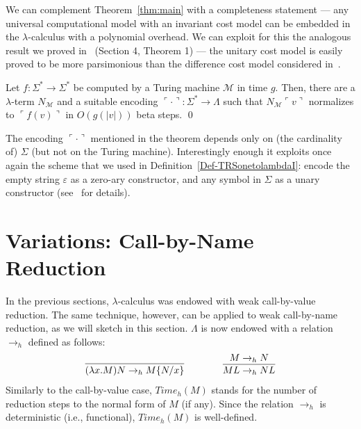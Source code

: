 \documentclass{LMCS}
\newcommand{\varone}{x}
\newcommand{\lambdaone}{M}
\newcommand{\lambdatwo}{N}
\newcommand{\lambdathree}{L}
\newcommand{\Lambdaterms}{\Lambda}
\newcommand{\Timew}[1]{\mathit{Time}_h(#1)}
\newcommand{\TMone}{\mathcal{M}}
\newcommand{\rewrlambdah}{\rightarrow_h}
\newcommand{\cod}[1]{\ulcorner #1\urcorner}
\newcounter{number}
\begin{document}
We can complement Theorem~\ref{thm:main} with a completeness statement --- any universal computational model 
with an invariant cost model can be embedded in the $\lambda$-calculus with a polynomial
overhead. We can exploit for this the analogous result we proved in~\cite{CIE2006} (Section 4, Theorem 1) --- 
the unitary cost model is easily proved to be more parsimonious than 
the difference cost model considered in~\cite{CIE2006}.

\begin{thm}
Let $f:\Sigma^*\rightarrow\Sigma^*$ be computed by a Turing machine
$\TMone$ in time $g$. Then, there are a $\lambda$-term $\lambdatwo_\TMone$
and a suitable encoding $\cod{\cdot}:\Sigma^*\rightarrow\Lambdaterms$ 
such that $\lambdatwo_\TMone\cod{v}$ normalizes to $\cod{f(v)}$ in 
$O(g(|v|))$ beta steps. \qed
\end{thm}

The encoding $\cod{\cdot}$ mentioned in the theorem depends only on (the cardinality of) 
$\Sigma$ (but not on the Turing machine). 
Interestingly enough it exploits once again the scheme that we used in Definition~\ref{Def-TRSonetolambdaI}: encode the empty string $\varepsilon$ as a zero-ary constructor,
and any symbol in $\Sigma$ as a unary constructor (see~\cite{CIE2006} for details).
\section{Variations: Call-by-Name Reduction}
\label{sect:HeadReduction}
In the previous sections, $\lambda$-calculus was endowed with weak call-by-value reduction.
The same technique, however, can be applied to weak call-by-name reduction, as we will sketch in
this section. $\Lambdaterms$ is now endowed with a relation $\rewrlambdah$ defined
as follows:
$$
\begin{array}{ccccc}
  \infer{(\lambda\varone.\lambdaone)\lambdatwo\rewrlambdah\lambdaone\{\lambdatwo/\varone\}}{}
  & & & &
  \infer{\lambdaone\lambdathree\rewrlambdah\lambdatwo\lambdathree}{\lambdaone\rewrlambdah\lambdatwo}
\end{array}
$$
Similarly to the call-by-value case, $\Timew{\lambdaone}$ stands for the number of
reduction steps to the normal form of $\lambdaone$ (if any). Since the relation
$\rewrlambdah$ is deterministic (i.e., functional), $\Timew{\lambdaone}$ is well-defined.
\end{document}
